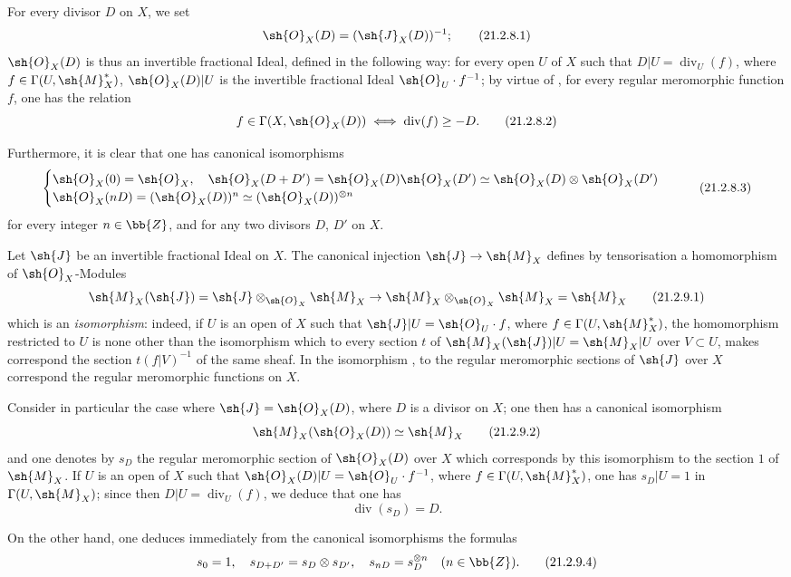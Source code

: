 \begin{env}[21.2.8]
\label{IV.21.2.8}
For every divisor $D$ on $X$, we set
\[
\label{IV.21.2.8.1}
  \sh{O}_X(D)=(\sh{J}_X(D))^{-1};
  \tag{21.2.8.1}
\]
$\sh{O}_X(D)$ is thus an invertible fractional Ideal, defined in the following way: for every open $U$ of $X$ such that $D|U=\operatorname{div}_U(f)$, where $f\in\Gamma(U,\sh{M}_X^*)$, $\sh{O}_X(D)|U$ is the invertible fractional Ideal $\sh{O}_U\cdot f^{-1}$;
by virtue of , for every regular meromorphic function $f$, one has the relation
\[
\label{IV.21.2.8.2}
  f\in\Gamma(X,\sh{O}_X(D))\iff\operatorname{div}(f)\geq -D.
  \tag{21.2.8.2}
\]

Furthermore, it is clear that one has canonical isomorphisms 
\[
\label{IV.21.2.8.3}
  \begin{cases}
    \sh{O}_X(0)=\sh{O}_X,\quad\sh{O}_X(D+D')=\sh{O}_X(D)\sh{O}_X(D')\simeq\sh{O}_X(D)\otimes\sh{O}_X(D')\\
    \sh{O}_X(nD)=(\sh{O}_X(D))^n\simeq(\sh{O}_X(D))^{\otimes n}
  \end{cases}
  \tag{21.2.8.3}
\]
for every integer $n\in\bb{Z}$, and for any two divisors $D$, $D'$ on $X$.
\end{env}

\begin{env}[21.2.9]
\label{IV.21.2.9}
Let $\sh{J}$ be an invertible fractional Ideal on $X$.
The canonical injection $\sh{J}\to\sh{M}_X$ defines by tensorisation a homomorphism of $\sh{O}_X$-Modules
\[
\label{IV.21.2.9.1}
  \sh{M}_X(\sh{J})=\sh{J}\otimes_{\sh{O}_X}\sh{M}_X\to\sh{M}_X\otimes_{\sh{O}_X}\sh{M}_X=\sh{M}_X
  \tag{21.2.9.1}
\]
which is an \emph{isomorphism}: indeed, if $U$ is an open of $X$ such that $\sh{J}|U=\sh{O}_U\cdot f$, where $f\in\Gamma(U,\sh{M}_X^*)$, the homomorphism  restricted to $U$ is none other than the isomorphism which to every section $t$ of $\sh{M}_X(\sh{J})|U=\sh{M}_X|U$ over $V\subset U$, makes correspond the section $t(f|V)^{-1}$ of the same sheaf.
In the isomorphism , to the regular meromorphic sections of $\sh{J}$ over $X$ correspond the regular meromorphic functions on $X$.

Consider in particular the case where $\sh{J}=\sh{O}_X(D)$, where $D$ is a divisor on $X$;
one then has a canonical isomorphism
\[
\label{IV.21.2.9.2}
  \sh{M}_X(\sh{O}_X(D))\simeq\sh{M}_X
  \tag{21.2.9.2}
\]
and one denotes by $s_D$ the regular meromorphic section of $\sh{O}_X(D)$ over $X$ which corresponds by this isomorphism to the section $1$ of $\sh{M}_X$.
If $U$ is an open of $X$ such that $\sh{O}_X(D)|U=\sh{O}_U\cdot f^{-1}$, where $f\in\Gamma(U,\sh{M}_X^*)$, one has $s_D|U=1$ in $\Gamma(U,\sh{M}_X)$;
since then $D|U=\operatorname{div}_U(f)$, we deduce  that one has
\[
\label{IV.21.2.9.3}
  \operatorname{div}(s_D)=D.
  \tag{21.2.9.3}
\]

On the other hand, one deduces immediately from the canonical isomorphisms  the formulas
\[
\label{IV.21.2.9.4}
  s_0=1,\quad s_{D+D'}=s_D\otimes s_{D'},\quad s_{nD}=s_D^{\otimes n}\quad(n\in\bb{Z}).
  \tag{21.2.9.4}
\]
\end{env}

